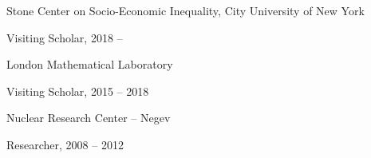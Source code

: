 \documentclass[10pt]{article}
\renewenvironment{itemize}{
  \begin{list}{}{
      \setlength{\leftmargin}{1.0em}
      \setlength{\itemsep}{0.1em}
      \setlength{\parskip}{0pt}
      \setlength{\parsep}{0.2em}
    }
}{
  \end{list}
}
\begin{document}
\begin{itemize}
\item Stone Center on Socio-Economic Inequality, City University of New York
  \begin{itemize}
  \item Visiting Scholar, 2018 --
  \end{itemize}
\end{itemize}

\begin{itemize}
\item London Mathematical Laboratory
  \begin{itemize}
  \item Visiting Scholar, 2015 -- 2018
  \end{itemize}
\end{itemize}


\begin{itemize}
\item Nuclear Research Center -- Negev
  \begin{itemize}
  \item Researcher, 2008 -- 2012
  \end{itemize}
\end{itemize}


%
\end{document}
